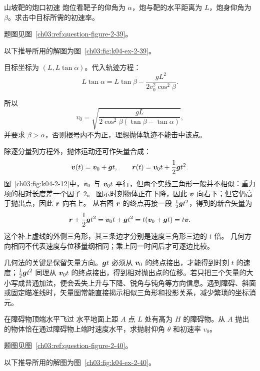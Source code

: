 {\begin{origexamplebox}{山坡靶的炮口初速}\label{ch03:ex:k04-2-39}
炮位看靶子的仰角为 $\alpha$，炮与靶的水平距离为 $L$，炮身仰角为 $\beta$。求击中目标所需的初速率。
\par 题图见图~\ref{ch03:ref:question-figure-2-39}。
\KQuestionBN
\end{origexamplebox}
\begin{xesolution}
以下推导所用的解图为图~\ref{ch03:fig:k04-ex-2-39}。

目标坐标为 $(L,L\tan\alpha)$。代入轨迹方程：
\[
L\tan\alpha=L\tan\beta-
\frac{gL^2}{2v_0^2\cos^2\beta}.
\]
\HillsideTargetDiagram

所以
\[
 \boxed{v_0=\sqrt{\frac{gL}{2\cos^2\beta(\tan\beta-\tan\alpha)}}},
\]
并要求 $\beta>\alpha$，否则根号内不为正，理想抛体轨迹不能击中该点。
\end{xesolution}

\ProjectileVectorsDiagram

除逐分量列方程外，抛体运动还可作矢量合成：
\begin{equation}
 \bm{v}(t)=\bm{v}_0+\bm{g} t,
 \qquad
 \bm{r}(t)=\bm{v}_0t+\frac12\bm{g} t^2.
\end{equation}
图~\ref{ch03:fig:k04-2-12}中，$\bm{v}_0$ 与 $\bm{v}_0t$ 平行，但两个实线三角形一般并不相似：重力项的相对长度差一个因子 $2$。
图示时刻物体正在下降，因此 $\bm{v}$ 向右下；但它仍高于抛出点，因此 $\bm{r}$ 向右上。
从右图 $\bm{r}$ 的终点再接一段 $\frac12\bm{g} t^2$，得到的新合矢量为
\[
 \bm{r}+\frac12\bm{g} t^2
 =\bm{v}_0t+\bm{g} t^2=t(\bm{v}_0+\bm{g}t)=t\bm{v}.
\]
这个补上虚线的外侧三角形，其三条边才分别是速度三角形三边的 $t$ 倍。
几何方向相同不代表速度与位移量纲相同；乘上同一时间后才可逐边比较。

几何法的关键是保留矢量方向。$\bm{g} t$ 必须从 $\bm{v}_0$ 的终点接出，才能得到时刻 $t$ 的速度；$\frac12\bm{g} t^2$ 同理从 $\bm{v}_0t$ 的终点接出，得到相对抛出点的位移。若只把三个矢量的大小写成普通加法，便会丢失上升与下降、锐角与钝角等方向信息。遇到障碍、斜面或固定瞄准线时，矢量图常能直接揭示相似三角形和投影关系，减少繁琐的坐标消元。

\begin{origexamplebox}{在障碍物顶端水平飞过}\label{ch03:ex:k04-2-40}
水平地面上距 $A$ 点 $L$ 处有高为 $H$ 的障碍物。从 $A$ 抛出的物体恰在通过障碍物上端时速度水平，求抛射仰角 $\theta$ 和初速率 $v_0$。
\par 题图见图~\ref{ch03:ref:question-figure-2-40}。
\KQuestionBO
\end{origexamplebox}
\begin{xesolution}
以下推导所用的解图为图~\ref{ch03:fig:k04-ex-2-40}。


\end{xesolution}}
